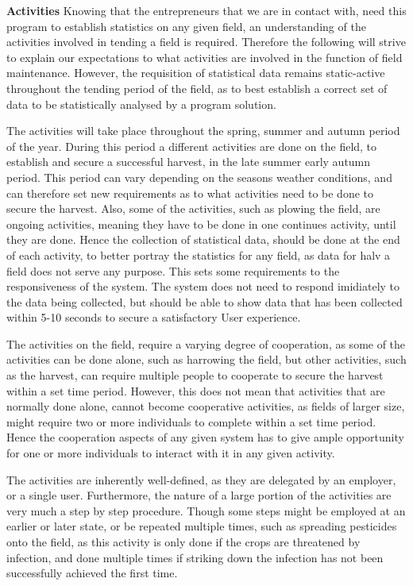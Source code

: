 \textbf{Activities}\newline
Knowing that the entrepreneurs that we are in contact with, need this program to establish statistics on any given field, an understanding of the activities involved in tending a field is required. Therefore the following will strive to explain our expectations to what activities are involved in the function of field maintenance. However, the requisition of statistical data remains static-active throughout the tending period of the field, as to best establish a correct set of data to be statistically analysed by a program solution.

The activities will take place throughout the spring, summer and autumn period of the year. During this period a different activities are done on the field, to establish and secure a successful harvest, in the late summer early autumn period. This period can vary depending on the seasons weather conditions, and can therefore set new requirements as to what activities need to be done to secure the harvest. Also, some of the activities, such as plowing the field, are ongoing activities, meaning they have to be done in one continues activity, until they are done. Hence the collection of statistical data, should be done at the end of each activity, to better portray the statistics for any field, as data for halv a field does not serve any purpose. This sets some requirements to the responsiveness of the system. The system does not need to respond imidiately to the data being collected, but should be able to show data that has been collected within 5-10 seconds to secure a satisfactory User experience.

The activities on the field, require a varying degree of cooperation, as some of the activities can be done alone, such as harrowing the field, but other activities, such as the harvest, can require multiple people to cooperate to secure the harvest within a set time period. However, this does not mean that activities that are normally done alone, cannot become cooperative activities, as fields of larger size, might require two or more individuals to complete within a set time period. Hence the cooperation aspects of any given system has to give ample opportunity for one or more individuals to interact with it in any given activity.

The activities are inherently well-defined, as they are delegated by an employer, or a single user. Furthermore, the nature of a large portion of the activities are very much a step by step procedure. Though some steps might be employed at an earlier or later state, or be repeated multiple times, such as spreading pesticides onto the field, as this activity is only done if the crops are threatened by infection, and done multiple times if striking down the infection has not been successfully achieved the first time.

